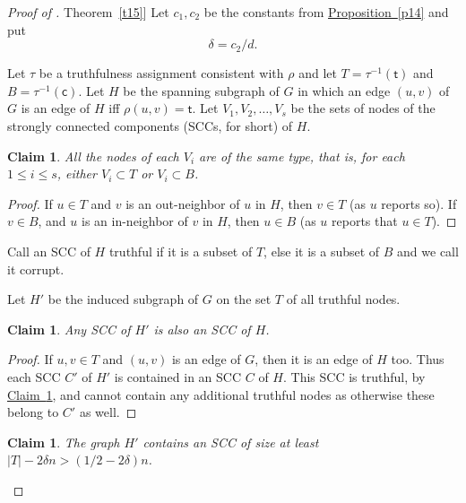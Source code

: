 \documentclass[11pt]{article}
\numberwithin{equation}{section}
\newtheorem{claim}[theorem]{Claim}
\theoremstyle{definition}
\theoremstyle{plain}
\newcommand{\expref}[2]{\hyperref[#2]{#1~\ref{#2}}}
\begin{document}
%
\begin{proof}[Proof of \expref{Theorem}{t15}]   %
Let $c_1,c_2$ be the
constants from \expref{Proposition}{p14} and put
\[
\delta = c_2/d.
\]

Let $\tau$ be a truthfulness assignment consistent with $\rho$ and
let $T = \tau^{-1}(\mathsf{t})$ and 
$B = \tau^{-1}(\mathsf{c})$. 
Let $H$ be the spanning  subgraph of $G$ in which an edge $(u,v)$
of $G$ is an edge of $H$ iff $\rho(u,v) = \mathsf{t}$.
%
%
Let $V_1,V_2, \ldots ,V_s$ 
be the sets of nodes of the strongly connected  components 
(SCCs, for short) of $H$. 
\begin{claim}
\label{c25}
All the nodes of each $V_i$ are of the same type, that is, for
each $1 \leq i \leq s$, either $V_i \subset T$ or $V_i \subset B$.
\end{claim}

\begin{proof} If $u \in T$ and $v$ is an out-neighbor of
$u$ in $H$, then 
$v \in T$ (as $u$ reports so). If $v \in B$, and $u$ is an
in-neighbor of $v$ in $H$, then 
$u \in B$ (as $u$ reports that $u \in T$).
\end{proof}

Call  an SCC  
of $H$ truthful if it is a subset of $T$, else it
is a subset of $B$ and we call it corrupt. 

Let $H'$ be the induced subgraph of $G$ on the set $T$ of all truthful 
nodes.
\begin{claim}
\label{c26}
Any SCC of $H'$ is also an SCC
of $H$.
\end{claim}

\begin{proof} If $u,v \in T$  and $(u,v)$ is an edge of $G$, then
it is an edge of $H$ too.
Thus each SCC $C'$ of
$H'$ is contained in an SCC $C$ of $H$.  This SCC is
truthful, by \expref{Claim}{c25}, and cannot contain any additional 
truthful nodes as otherwise these belong to $C'$ as well. 
\end{proof}

\begin{claim}
\label{c27}
The graph $H'$ contains an SCC of size at least
$|T|-2 \delta n > (1/2-2 \delta)n$. 
%
%
\end{claim}


\end{proof}
\end{document}
